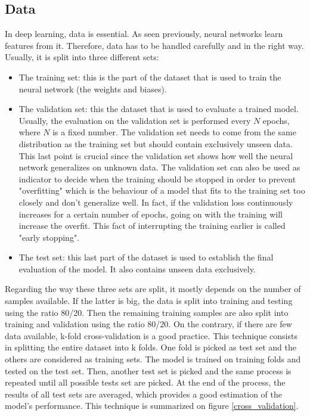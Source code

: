 \subsection{Data}
In deep learning, data is essential. As seen previously, neural networks learn features from it. Therefore, data has to be handled carefully and in the right way. Usually, it is split into three different sets:
\begin{itemize}
\item The training set: this is the part of the dataset that is used to train the neural network (the weights and biases).
\item The validation set: this the dataset that is used to evaluate a trained model. Usually, the evaluation on the validation set is performed every $N$ epochs, where $N$ is a fixed number. The validation set needs to come from the same distribution as the training set but should contain exclusively unseen data. This last point is crucial since the validation set shows how well the neural network generalizes on unknown data. The validation set can also be used as indicator to decide when the training should be stopped in order to prevent "overfitting" which is the behaviour of a model that fits to the training set too closely and don't generalize well. In fact, if the validation loss continuously increases for a certain number of epochs, going on with the training will increase the overfit. This fact of interrupting the training earlier is called "early stopping".
\item The test set: this last part of the dataset is used to establish the final evaluation of the model. It also contains unseen data exclusively. 
\end{itemize}
Regarding the way these three sets are split, it mostly depends on the number of samples available. If the latter is big, the data is split into training and testing using the ratio 80/20. Then the remaining training samples are also split into training and validation using the ratio 80/20. On the contrary, if there are few data available, k-fold cross-validation is a good practice. This technique consists in splitting the entire dataset into k folds. One fold is picked as test set and the others are considered as training sets. The model is trained on training folds and tested on the test set. Then, another test set is picked and the same process is repeated until all possible tests set are picked. At the end of the process, the results of all test sets are averaged, which provides a good estimation of the model's performance. This technique is summarized on figure \ref{cross_validation}.

